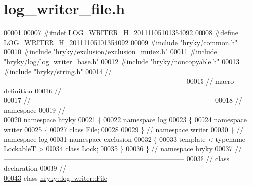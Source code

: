 \hypertarget{log__writer__file_8h_source}{\section{log\-\_\-writer\-\_\-file.\-h}
}

\begin{DoxyCode}
00001 
00007 \textcolor{preprocessor}{#ifndef LOG\_WRITER\_H\_20111105101354092}
00008 \textcolor{preprocessor}{}\textcolor{preprocessor}{#define LOG\_WRITER\_H\_20111105101354092}
00009 \textcolor{preprocessor}{}\textcolor{preprocessor}{#include "\hyperlink{common_8h}{hryky/common.h}"}
00010 \textcolor{preprocessor}{#include "\hyperlink{exclusion__mutex_8h}{hryky/exclusion/exclusion_mutex.h}"}
00011 \textcolor{preprocessor}{#include "\hyperlink{log__writer__base_8h}{hryky/log/log_writer_base.h}"}
00012 \textcolor{preprocessor}{#include "\hyperlink{noncopyable_8h}{hryky/noncopyable.h}"}
00013 \textcolor{preprocessor}{#include "\hyperlink{string_8h}{hryky/string.h}"}
00014 \textcolor{comment}{//
      ------------------------------------------------------------------------------}
00015 \textcolor{comment}{// macro definition}
00016 \textcolor{comment}{//
      ------------------------------------------------------------------------------}
00017 \textcolor{comment}{//
      ------------------------------------------------------------------------------}
00018 \textcolor{comment}{// namespace}
00019 \textcolor{comment}{//
      ------------------------------------------------------------------------------}
00020 \textcolor{keyword}{namespace }hryky
00021 \{
00022 \textcolor{keyword}{namespace }log
00023 \{
00024 \textcolor{keyword}{namespace }writer
00025 \{
00027     \textcolor{keyword}{class }File;
00028     
00029 \} \textcolor{comment}{// namespace writer}
00030 \} \textcolor{comment}{// namespace log}
00031 \textcolor{keyword}{namespace }exclusion
00032 \{
00033     \textcolor{keyword}{template} < \textcolor{keyword}{typename} LockableT >
00034     \textcolor{keyword}{class }Lock;
00035 \}
00036 \} \textcolor{comment}{// namespace hryky}
00037 \textcolor{comment}{//
      ------------------------------------------------------------------------------}
00038 \textcolor{comment}{// class declaration}
00039 \textcolor{comment}{//
      ------------------------------------------------------------------------------}
\hypertarget{log__writer__file_8h_source_l00043}{}\hyperlink{classhryky_1_1log_1_1writer_1_1_file}{00043} \textcolor{comment}{}\textcolor{keyword}{class }\hyperlink{classhryky_1_1log_1_1writer_1_1_file}{hryky::log::writer::File}

\end{DoxyCode}
